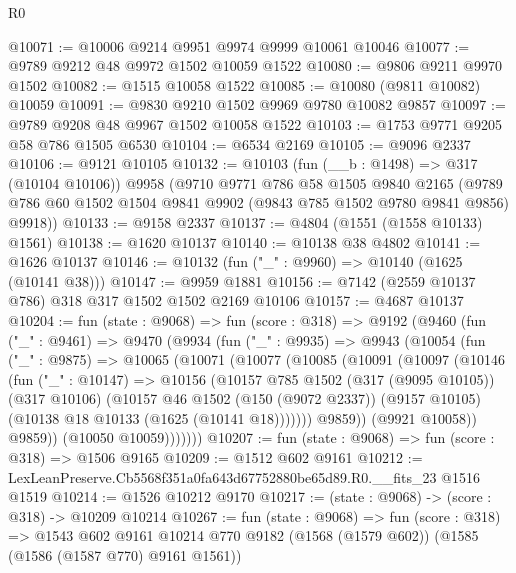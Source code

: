 \begin{lexlean}{R0}
\begin{coremodule}
@10071 := @10006 @9214 @9951 @9974 @9999 @10061 @10046
@10077 := @9789 @9212 @48 @9972 @1502 @10059 @1522
@10080 := @9806 @9211 @9970 @1502
@10082 := @1515 @10058 @1522
@10085 := @10080 (@9811 @10082) @10059
@10091 := @9830 @9210 @1502 @9969 @9780 @10082 @9857
@10097 := @9789 @9208 @48 @9967 @1502 @10058 @1522
@10103 := @1753 @9771 @9205 @58 @786 @1505 @6530
@10104 := @6534 @2169
@10105 := @9096 @2337
@10106 := @9121 @10105
@10132 := @10103
    (fun (__b : @1498) => @317 (@10104 @10106))
    @9958
    (@9710
      @9771
      @786
      @58
      @1505
      @9840
      @2165
      (@9789 @786 @60 @1502 @1504 @9841 @9902 (@9843 @785 @1502 @9780 @9841 @9856) @9918))
@10133 := @9158 @2337
@10137 := @4804 (@1551 (@1558 @10133) @1561)
@10138 := @1620 @10137
@10140 := @10138 @38 @4802
@10141 := @1626 @10137
@10146 := @10132 (fun ("_" : @9960) => @10140 (@1625 (@10141 @38)))
@10147 := @9959 @1881
@10156 := @7142 (@2559 @10137 @786) @318 @317 @1502 @1502 @2169 @10106
@10157 := @4687 @10137
@10204 := fun (state : @9068) =>
  fun (score : @318) =>
  @9192
    (@9460
      (fun ("_" : @9461) =>
      @9470
        (@9934
          (fun ("_" : @9935) =>
          @9943
            (@10054
              (fun ("_" : @9875) =>
              @10065
                (@10071
                  (@10077
                    (@10085
                      (@10091
                        (@10097
                          (@10146
                            (fun ("_" : @10147) =>
                            @10156
                              (@10157
                                @785
                                @1502
                                (@317 (@9095 @10105))
                                (@317 @10106)
                                (@10157
                                  @46
                                  @1502
                                  (@150 (@9072 @2337))
                                  (@9157 @10105)
                                  (@10138 @18 @10133 (@1625 (@10141 @18)))))))
                          @9859))
                      (@9921 @10058))
                    @9859))
                (@10050 @10059)))))))
@10207 := fun (state : @9068) => fun (score : @318) => @1506 @9165
@10209 := @1512 @602 @9161
@10212 := LexLeanPreserve.Cb5568f351a0fa643d67752880be65d89.R0.__fits_23 @1516 @1519
@10214 := @1526 @10212 @9170
@10217 := (state : @9068) -> (score : @318) -> @10209 @10214
@10267 := fun (state : @9068) =>
  fun (score : @318) =>
  @1543
    @602
    @9161
    @10214
    @770
    @9182
    (@1568 (@1579 @602))
    (@1585 (@1586 (@1587 @770) @9161 @1561))

\end{coremodule}
\end{lexlean}
